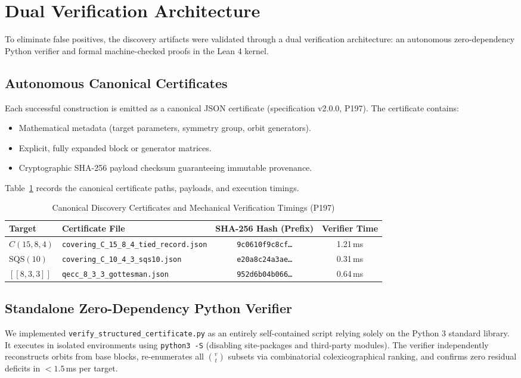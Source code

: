 \documentclass[11pt,a4paper]{article}
\begin{document}
\section{Dual Verification Architecture}
\label{sec:verification}

To eliminate false positives, the discovery artifacts were validated through a dual verification architecture: an autonomous zero-dependency Python verifier and formal machine-checked proofs in the Lean 4 kernel.

\subsection{Autonomous Canonical Certificates}
\label{sec:certificates}
Each successful construction is emitted as a canonical JSON certificate (specification v2.0.0, P197). The certificate contains:
\begin{itemize}
    \item Mathematical metadata (target parameters, symmetry group, orbit generators).
    \item Explicit, fully expanded block or generator matrices.
    \item Cryptographic SHA-256 payload checksum guaranteeing immutable provenance.
\end{itemize}
Table~\ref{tab:certificates} records the canonical certificate paths, payloads, and execution timings.

\begin{table}[h]
\centering
\caption{Canonical Discovery Certificates and Mechanical Verification Timings (P197)}
\label{tab:certificates}
\begin{tabular}{llcc}
\toprule
\textbf{Target} & \textbf{Certificate File} & \textbf{SHA-256 Hash (Prefix)} & \textbf{Verifier Time} \\
\midrule
$C(15, 8, 4)$ & \texttt{covering\_C\_15\_8\_4\_tied\_record.json} & \texttt{9c0610f9c8cf\dots} & 1.21\,ms \\
$\text{SQS}(10)$ & \texttt{covering\_C\_10\_4\_3\_sqs10.json} & \texttt{e20a8c24a3ae\dots} & 0.31\,ms \\
$[[8, 3, 3]]$ & \texttt{qecc\_8\_3\_3\_gottesman.json} & \texttt{952d6b04b066\dots} & 0.64\,ms \\
\bottomrule
\end{tabular}
\end{table}

\subsection{Standalone Zero-Dependency Python Verifier}
\label{sec:standalone_verifier}
We implemented \texttt{verify\_structured\_certificate.py} as an entirely self-contained script relying solely on the Python 3 standard library. It executes in isolated environments using \texttt{python3 -S} (disabling site-packages and third-party modules). The verifier independently reconstructs orbits from base blocks, re-enumerates all $\binom{v}{t}$ subsets via combinatorial colexicographical ranking, and confirms zero residual deficits in $< 1.5$\,ms per target.
\end{document}
